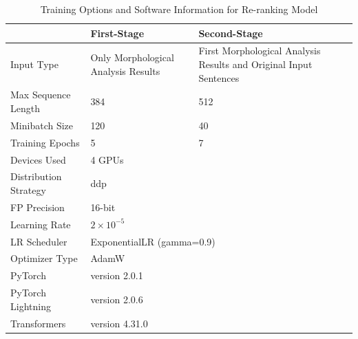 \documentclass[AMS,STIX2COL]{WileyNJD-v2}
\begin{document}
    \begin{table}[h]
        \centering
        \footnotesize
        \caption{Training Options and Software Information for Re-ranking Model}
        \label{tab:training-options}
        \begin{tabular}{|p{24mm}|p{25mm}|p{25mm}|}
            \hline
            ~                     & \textbf{First-Stage}                & \textbf{Second-Stage}                                        \\ \hline
            Input Type            & Only Morphological Analysis Results & First Morphological Analysis Results and Original Input Sentences \\ \hline
            Max Sequence Length   & 384                                 & 512                                                               \\ \hline
            Minibatch Size        & 120                                 & 40                                                                \\ \hline
            Training Epochs       & 5                                   & 7                                                                 \\ \hline
            Devices Used          & \multicolumn{2}{l|}{4 GPUs}                                                                             \\ \hline
            Distribution Strategy & \multicolumn{2}{l|}{ddp}                                                                                \\ \hline
            FP Precision          & \multicolumn{2}{l|}{16-bit}                                                                             \\ \hline
            Learning Rate         & \multicolumn{2}{l|}{$2 \times 10^{-5}$}                                                                 \\ \hline
            LR Scheduler          & \multicolumn{2}{l|}{ExponentialLR (gamma=0.9)}                                                          \\ \hline
            Optimizer Type        & \multicolumn{2}{l|}{AdamW}                                                                              \\ \hline
            PyTorch               & \multicolumn{2}{l|}{version 2.0.1}                                                                      \\ \hline
            PyTorch Lightning     & \multicolumn{2}{l|}{version 2.0.6}                                                                      \\ \hline
            Transformers          & \multicolumn{2}{l|}{version 4.31.0}                                                                     \\ \hline
        \end{tabular}
    \end{table}
\end{document}
